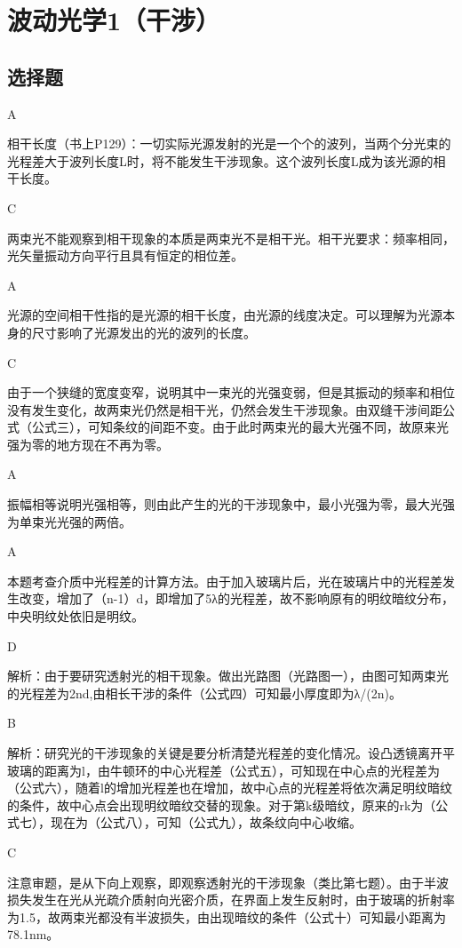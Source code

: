 \chapter{波动光学1（干涉）}
\section{选择题}
\exercise A

\solve 相干长度（书上P129）：一切实际光源发射的光是一个个的波列，当两个分光束的光程差大于波列长度L时，将不能发生干涉现象。这个波列长度L成为该光源的相干长度。 

\exercise C

\solve 两束光不能观察到相干现象的本质是两束光不是相干光。相干光要求：频率相同，光矢量振动方向平行且具有恒定的相位差。

\exercise A

\solve 光源的空间相干性指的是光源的相干长度，由光源的线度决定。可以理解为光源本身的尺寸影响了光源发出的光的波列的长度。

\exercise C

\solve 由于一个狭缝的宽度变窄，说明其中一束光的光强变弱，但是其振动的频率和相位没有发生变化，故两束光仍然是相干光，仍然会发生干涉现象。由双缝干涉间距公式（公式三），可知条纹的间距不变。由于此时两束光的最大光强不同，故原来光强为零的地方现在不再为零。

\exercise A

\solve 振幅相等说明光强相等，则由此产生的光的干涉现象中，最小光强为零，最大光强为单束光光强的两倍。

\exercise A

\solve 本题考查介质中光程差的计算方法。由于加入玻璃片后，光在玻璃片中的光程差发生改变，增加了（n-1）d，即增加了5λ的光程差，故不影响原有的明纹暗纹分布，中央明纹处依旧是明纹。

\exercise D

\solve 解析：由于要研究透射光的相干现象。做出光路图（光路图一），由图可知两束光的光程差为2nd,由相长干涉的条件（公式四）可知最小厚度即为λ/(2n)。

\exercise B

\solve 解析：研究光的干涉现象的关键是要分析清楚光程差的变化情况。设凸透镜离开平玻璃的距离为l，由牛顿环的中心光程差（公式五），可知现在中心点的光程差为（公式六），随着l的增加光程差也在增加，故中心点的光程差将依次满足明纹暗纹的条件，故中心点会出现明纹暗纹交替的现象。对于第k级暗纹，原来的rk为（公式七），现在为（公式八），可知（公式九），故条纹向中心收缩。

\exercise C

\solve 注意审题，是从下向上观察，即观察透射光的干涉现象（类比第七题）。由于半波损失发生在光从光疏介质射向光密介质，在界面上发生反射时，由于玻璃的折射率为1.5，故两束光都没有半波损失，由出现暗纹的条件（公式十）可知最小距离为78.1nm。

